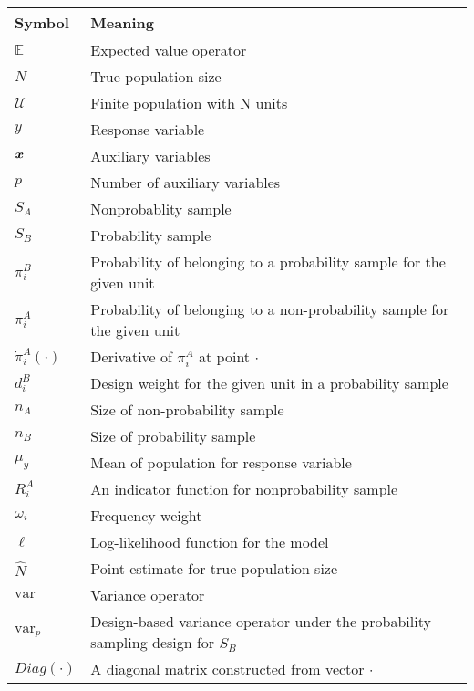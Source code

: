 \documentclass[
  letterpaper,
  DIV=11,
  numbers=noendperiod]{scrreprt}
\begin{document}
\begin{longtable}[]{@{}
  >{\raggedright\arraybackslash}p{}
  >{\raggedright\arraybackslash}p{}@{}}
\toprule\noalign{}
\begin{minipage}[b]{\linewidth}\raggedright
Symbol
\end{minipage} & \begin{minipage}[b]{\linewidth}\raggedright
Meaning
\end{minipage} \\
\midrule\noalign{}
\endhead
\bottomrule\noalign{}
\endlastfoot
\(\mathbb{E}\) & Expected value operator \\
\(N\) & True population size \\
\(\mathcal{U}\) & Finite population with N units \\
\(y\) & Response variable \\
\(\boldsymbol{x}\) & Auxiliary variables \\
\(p\) & Number of auxiliary variables \\
\(S_A\) & Nonprobablity sample \\
\(S_B\) & Probability sample \\
\(\pi_i^B\) & Probability of belonging to a probability sample for the
given unit \\
\(\pi_i^A\) & Probability of belonging to a non-probability sample for
the given unit \\
\(\dot{\pi}_i^A(\cdot)\) & Derivative of \(\pi_i^A\) at point
\(\cdot\) \\
\(d_i^B\) & Design weight for the given unit in a probability sample \\
\(n_A\) & Size of non-probability sample \\
\(n_B\) & Size of probability sample \\
\(\mu_{y}\) & Mean of population for response variable \\
\(R_{i}^A\) & An indicator function for nonprobability sample \\
\(\omega_i\) & Frequency weight \\
\(\ell\) & Log-likelihood function for the model \\
\(\hat{N}\) & Point estimate for true population size \\
\(\text{var}\) & Variance operator \\
\(\text{var}_p\) & Design-based variance operator under the probability
sampling design for \(S_B\) \\
\(Diag(\cdot)\) & A diagonal matrix constructed from vector \(\cdot\) \\

\end{longtable}
\end{document}
